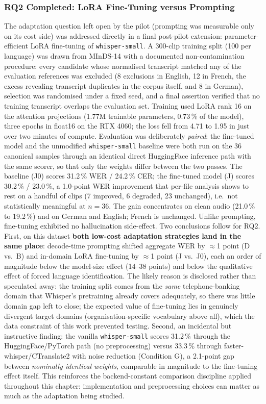 \documentclass[12pt]{report}
\begin{document}
\subsubsection{RQ2 Completed: LoRA Fine-Tuning versus Prompting}
The adaptation question left open by the pilot (prompting was measurable only on its cost side) was addressed directly in a final post-pilot extension: parameter-efficient LoRA fine-tuning of \texttt{whisper-small}. A 300-clip training split (100 per language) was drawn from MInDS-14 with a documented non-contamination procedure: every candidate whose normalised transcript matched any of the evaluation references was excluded (8 exclusions in English, 12 in French, the excess revealing transcript duplicates in the corpus itself, and 8 in German), selection was randomised under a fixed seed, and a final assertion verified that no training transcript overlaps the evaluation set. Training used LoRA rank 16 on the attention projections (1.77M trainable parameters, 0.73\,\% of the model), three epochs in float16 on the RTX 4060; the loss fell from 4.71 to 1.95 in just over two minutes of compute.
Evaluation was deliberately \emph{paired}: the fine-tuned model and the unmodified \texttt{whisper-small} baseline were both run on the 36 canonical samples through an identical direct HuggingFace inference path with the same scorer, so that only the weights differ between the two passes. The baseline (J0) scores 31.2\,\% WER / 24.2\,\% CER; the fine-tuned model (J) scores 30.2\,\% / 23.0\,\%, a 1.0-point WER improvement that per-file analysis shows to rest on a handful of clips (7 improved, 6 degraded, 23 unchanged), i.e.\ not statistically meaningful at $n=36$. The gain concentrates on clean audio (21.0\,\% to 19.2\,\%) and on German and English; French is unchanged. Unlike prompting, fine-tuning exhibited no hallucination side-effect.
Two conclusions follow for RQ2. First, on this dataset \textbf{both low-cost adaptation strategies land in the same place}: decode-time prompting shifted aggregate WER by $\approx$1 point (D vs.\ B) and in-domain LoRA fine-tuning by $\approx$1 point (J vs.\ J0), each an order of magnitude below the model-size effect (14--38 points) and below the qualitative effect of forced language identification. The likely reason is disclosed rather than speculated away: the training split comes from the \emph{same} telephone-banking domain that Whisper's pretraining already covers adequately, so there was little domain gap left to close; the expected value of fine-tuning lies in genuinely divergent target domains (organisation-specific vocabulary above all), which the data constraint of this work prevented testing. Second, an incidental but instructive finding: the vanilla \texttt{whisper-small} scores 31.2\,\% through the HuggingFace/PyTorch path (no preprocessing) versus 33.3\,\% through faster-whisper/CTranslate2 with noise reduction (Condition G), a 2.1-point gap between \emph{nominally identical weights}, comparable in magnitude to the fine-tuning effect itself. This reinforces the backend-constant comparison discipline applied throughout this chapter: implementation and preprocessing choices can matter as much as the adaptation being studied.
\end{document}

